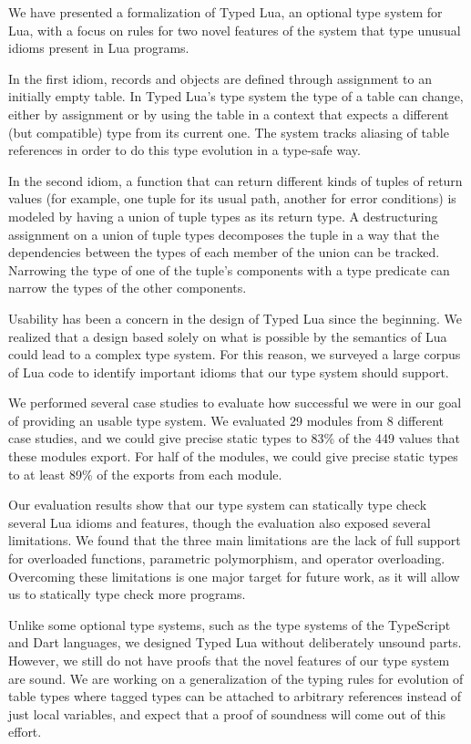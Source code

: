 \documentclass[preprint]{sigplanconf}
\begin{document}
We have presented a formalization of Typed Lua,
an optional type system for Lua, with a focus on rules
for two novel features of the system that type unusual
idioms present in Lua programs.

In the first idiom, records and objects are
defined through assignment to an initially empty
table. In Typed Lua's type system the type of a
table can change, either by assignment
or by using the table in a context that expects
a different (but compatible) type from its current one.
The system tracks aliasing of table references
in order to do this type evolution in a type-safe
way.

In the second idiom, a function that can return different
kinds of tuples of return values (for example, one
tuple for its usual path, another for error conditions)
is modeled by having a union of tuple types as its return
type. A destructuring assignment on a union of tuple types
decomposes the tuple in a way that the dependencies between
the types of each member of the union can be tracked.
Narrowing the type of one of the tuple's components with
a type predicate can narrow the types of the other
components.

Usability has been a concern in the design of Typed Lua since the beginning. We realized that a design based solely on what
is possible by the semantics of Lua could lead to a 
complex type system. For this reason, we surveyed a large
corpus of Lua code to identify important idioms that
our type system should support.

We performed several
case studies to evaluate how successful we were in our goal of
providing an usable type system.
We evaluated 29 modules from 8 different case studies,
and we could give precise static types to 83\% of the 449
values that these modules export.
For half of the modules, we could give precise static types to
at least 89\% of the exports from each module.

Our evaluation results show that our type system can statically
type check several Lua idioms and features, though the evaluation
also exposed several limitations.
We found that the three main limitations are the lack of
full support for overloaded functions, parametric polymorphism,
and operator overloading.
Overcoming these limitations is one major target for future work,
as it will allow us to statically type check more programs.

Unlike some optional type systems, such as the type systems
of the TypeScript and Dart languages, we designed Typed Lua without deliberately unsound parts.
However, we still do not have proofs that the novel features of
our type system are sound. We are working on a generalization
of the typing rules for evolution of table types where tagged
types can be attached to arbitrary references instead of
just local variables, and expect that a proof of soundness
will come out of this effort.
\end{document}

